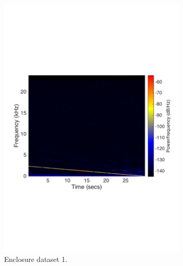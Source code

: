 \begin{figure}[H]
\centering
\begin{subfigure}[t]{0.47\textwidth}
	\includegraphics[width=1\textwidth]{figures/spectrogram_enclosure1.pdf}
	\caption{Enclosure dataset 1.}
	\label{fig:spectrogram_enclosure1}
\end{subfigure}
\begin{subfigure}[t]{0.47\textwidth}

\end{subfigure}
\end{figure}
